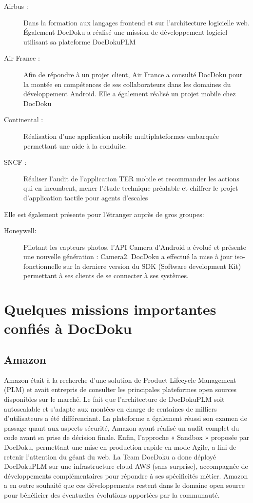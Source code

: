 \documentclass[11pt]{report}
\begin{document}
		\begin{description}
			\item[Airbus :] Dans la formation aux langages frontend et sur l'architecture logicielle web. Également DocDoku a réalisé une mission de développement logiciel utilisant sa plateforme DocDokuPLM
			\item[Air France : ] Afin de répondre à un projet client, Air France a consulté DocDoku pour la montée en compétences de ses collaborateurs dans les domaines du développement Android. Elle a également réalisé un projet mobile chez DocDoku
			\item[Continental :] Réalisation d'une application mobile multiplateformes embarquée permettant une aide à la conduite.
			\item[SNCF :] Réaliser l'audit de l'application TER mobile et recommander les actions qui en incombent, mener l'étude technique préalable et chiffrer le projet d'application tactile pour agents d'escales
		\end{description}

		\singlespacing
		\noindent
		Elle est également présente pour l'étranger auprès de gros groupes: 

		\begin{description}
			\item[Honeywell: ] Pilotant les capteurs photos, l'API Camera d'Android a évolué et présente une nouvelle génération : Camera2. DocDoku a effectué la mise à jour iso-fonctionnelle sur la derniere version du SDK (Software development Kit) permettant à ses clients de se connecter à ses systèmes.
		\end{description}

		\section{Quelques missions importantes confiés à DocDoku}

			\subsection{Amazon}
				Amazon était à la recherche d'une solution de Product Lifecycle Management (PLM) et avait entrepris de consulter les principales plateformes open sources disponibles sur le marché.
				\singlespacing
				Le fait que l'architecture de DocDokuPLM soit autoscalable et s'adapte aux montées en charge de centaines de milliers d'utilisateurs a été différenciant.
				La plateforme a également réussi son examen de passage quant aux aspects sécurité, Amazon ayant réalisé un audit complet du code avant sa prise de décision finale. Enfin, l'approche « Sandbox » proposée par DocDoku, permettant une mise en production rapide en mode Agile, a fini de retenir l'attention du géant du web.
				La Team DocDoku a donc déployé DocDokuPLM sur une infrastructure cloud AWS (sans surprise), accompagnée de développements complémentaires pour répondre à ses spécificités métier.
				Amazon a en outre souhaité que ces développements restent dans le domaine open source pour bénéficier des éventuelles évolutions apportées par la communauté.
\end{document}
